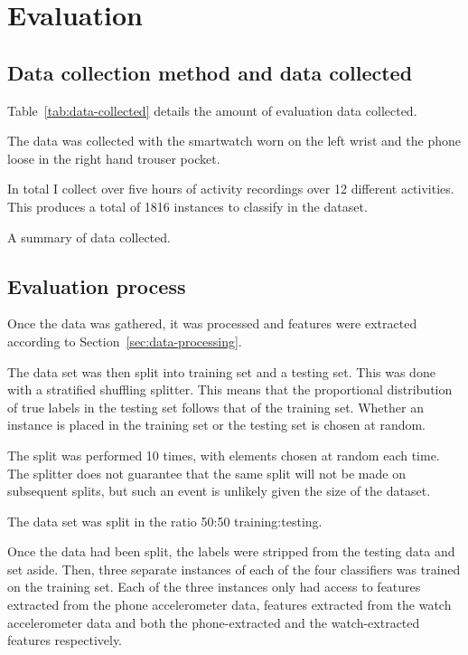 \chapter{Evaluation}
  \section{Data collection method and data collected}
    Table~\ref{tab:data-collected} details the amount of evaluation data collected.
    
    The data was collected with the smartwatch worn on the left wrist and the phone loose in the right hand trouser pocket.
    
    In total I collect over five hours of activity recordings over 12 different activities. This produces a total of 1816 instances to classify in the dataset.
    \begin{table}
      \centering
        
      \caption{A summary of data collected.}
      \label{tab:data-collected}
    \end{table}
  \section{Evaluation process}
    Once the data was gathered, it was processed and features were extracted according to Section~\ref{sec:data-processing}.
    
    The data set was then split into training set and a testing set. This was done with a stratified shuffling splitter. This means that the proportional distribution of true labels in the testing set follows that of the training set. Whether an instance is placed in the training set or the testing set is chosen at random.
    
    The split was performed 10 times, with elements chosen at random each time. The splitter does not guarantee that the same split will not be made on subsequent splits, but such an event is unlikely given the size of the dataset.
    
    The data set was split in the ratio 50:50 training:testing.
    
    Once the data had been split, the labels were stripped from the testing data and set aside. Then, three separate instances of each of the four classifiers was trained on the training set. Each of the three instances only had access to features extracted from the phone accelerometer data, features extracted from the watch accelerometer data and both the phone-extracted and the watch-extracted features respectively.
    
